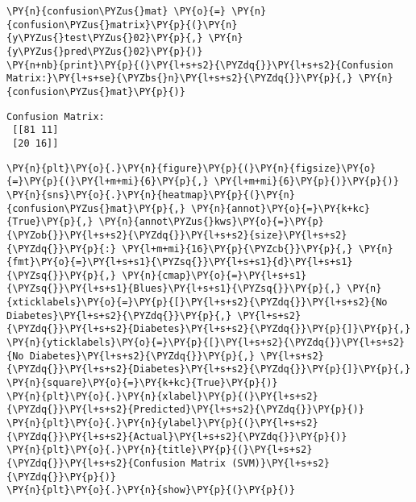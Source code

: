     \begin{tcolorbox}[breakable, size=fbox, boxrule=1pt, pad at break*=1mm,colback=cellbackground, colframe=cellborder]
\begin{Verbatim}[commandchars=\\\{\}]
\PY{n}{confusion\PYZus{}mat} \PY{o}{=} \PY{n}{confusion\PYZus{}matrix}\PY{p}{(}\PY{n}{y\PYZus{}test\PYZus{}02}\PY{p}{,} \PY{n}{y\PYZus{}pred\PYZus{}02}\PY{p}{)}
\PY{n+nb}{print}\PY{p}{(}\PY{l+s+s2}{\PYZdq{}}\PY{l+s+s2}{Confusion Matrix:}\PY{l+s+se}{\PYZbs{}n}\PY{l+s+s2}{\PYZdq{}}\PY{p}{,} \PY{n}{confusion\PYZus{}mat}\PY{p}{)}
\end{Verbatim}
\end{tcolorbox}

    \begin{Verbatim}[commandchars=\\\{\}]
Confusion Matrix:
 [[81 11]
 [20 16]]
    \end{Verbatim}

    \begin{tcolorbox}[breakable, size=fbox, boxrule=1pt, pad at break*=1mm,colback=cellbackground, colframe=cellborder]
\begin{Verbatim}[commandchars=\\\{\}]
\PY{n}{plt}\PY{o}{.}\PY{n}{figure}\PY{p}{(}\PY{n}{figsize}\PY{o}{=}\PY{p}{(}\PY{l+m+mi}{6}\PY{p}{,} \PY{l+m+mi}{6}\PY{p}{)}\PY{p}{)}
\PY{n}{sns}\PY{o}{.}\PY{n}{heatmap}\PY{p}{(}\PY{n}{confusion\PYZus{}mat}\PY{p}{,} \PY{n}{annot}\PY{o}{=}\PY{k+kc}{True}\PY{p}{,} \PY{n}{annot\PYZus{}kws}\PY{o}{=}\PY{p}{\PYZob{}}\PY{l+s+s2}{\PYZdq{}}\PY{l+s+s2}{size}\PY{l+s+s2}{\PYZdq{}}\PY{p}{:} \PY{l+m+mi}{16}\PY{p}{\PYZcb{}}\PY{p}{,} \PY{n}{fmt}\PY{o}{=}\PY{l+s+s1}{\PYZsq{}}\PY{l+s+s1}{d}\PY{l+s+s1}{\PYZsq{}}\PY{p}{,} \PY{n}{cmap}\PY{o}{=}\PY{l+s+s1}{\PYZsq{}}\PY{l+s+s1}{Blues}\PY{l+s+s1}{\PYZsq{}}\PY{p}{,} \PY{n}{xticklabels}\PY{o}{=}\PY{p}{[}\PY{l+s+s2}{\PYZdq{}}\PY{l+s+s2}{No Diabetes}\PY{l+s+s2}{\PYZdq{}}\PY{p}{,} \PY{l+s+s2}{\PYZdq{}}\PY{l+s+s2}{Diabetes}\PY{l+s+s2}{\PYZdq{}}\PY{p}{]}\PY{p}{,} \PY{n}{yticklabels}\PY{o}{=}\PY{p}{[}\PY{l+s+s2}{\PYZdq{}}\PY{l+s+s2}{No Diabetes}\PY{l+s+s2}{\PYZdq{}}\PY{p}{,} \PY{l+s+s2}{\PYZdq{}}\PY{l+s+s2}{Diabetes}\PY{l+s+s2}{\PYZdq{}}\PY{p}{]}\PY{p}{,} \PY{n}{square}\PY{o}{=}\PY{k+kc}{True}\PY{p}{)}
\PY{n}{plt}\PY{o}{.}\PY{n}{xlabel}\PY{p}{(}\PY{l+s+s2}{\PYZdq{}}\PY{l+s+s2}{Predicted}\PY{l+s+s2}{\PYZdq{}}\PY{p}{)}
\PY{n}{plt}\PY{o}{.}\PY{n}{ylabel}\PY{p}{(}\PY{l+s+s2}{\PYZdq{}}\PY{l+s+s2}{Actual}\PY{l+s+s2}{\PYZdq{}}\PY{p}{)}
\PY{n}{plt}\PY{o}{.}\PY{n}{title}\PY{p}{(}\PY{l+s+s2}{\PYZdq{}}\PY{l+s+s2}{Confusion Matrix (SVM)}\PY{l+s+s2}{\PYZdq{}}\PY{p}{)}
\PY{n}{plt}\PY{o}{.}\PY{n}{show}\PY{p}{(}\PY{p}{)}
\end{Verbatim}
\end{tcolorbox}

